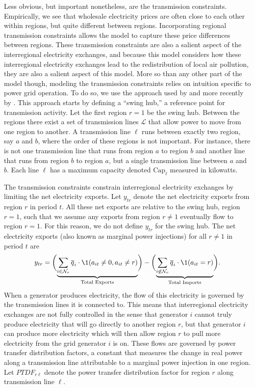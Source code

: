 Less obvious, but important nonetheless, are the transmission constraints. Empirically, we see that wholesale electricity prices are often close to each other within regions, but quite different between regions. Incorporating regional transmission constraints allows the model to capture these price differences between regions. These transmission constraints are also a salient aspect of the interregional electricity exchanges, and because this model considers how these interregional electricity exchanges lead to the redistribution of local air pollution, they are also a salient aspect of this model. More so than any other part of the model though, modeling the transmission constraints relies on intuition specific to power grid operation. To do so, we use the approach used by \cite{bushnell2017strategic} and more recently by \cite{fowlie2021border}. This approach starts by defining a ``swing hub,'' a reference point for transmission activity. Let the first region $r= 1$ be the swing hub. Between the regions there exist a set of transmission lines $\mathcal{L}$ that allow power to move from one region to another. A transmission line $\ell$ runs between exactly two region, say $a$ and $b$, where the order of these regions is not important. For instance, there is not one transmission line that runs from region $a$ to region $b$ and another line that runs from region $b$ to region $a$, but a single transmission line between $a$ and $b$. Each line $\ell$ has a maximum capacity denoted $\text{Cap}_\ell$ measured in kilowatts. 

The transmission constraints constrain interregional electricity exchanges by limiting the net electricity exports. Let $y_{tr}$ denote the net electricity exports from region $r$ in period $t$. All these net exports are relative to the swing hub, region $r =1$, such that we assume any exports from region $r \neq 1$ eventually flow to region $r = 1$. For this reason, we do not define $y_{tr}$ for the swing hub. The net electricity exports (also known as marginal power injections) for all $r \neq 1$ in period $t$ are
\begin{equation}
    y_{tr} = \biggl(\underbrace{\sum_{i \in \mathcal{N}_r} \overline{q}_i \cdot \1(a_{it} \neq 0, a_{it} \neq r)}_{\text{Total Exports}}  \biggr) - \biggl( \underbrace{\sum_{i\not\in \mathcal{N}_r} \overline{q}_i \cdot \1(a_{it} = r)}_{\text{Total Imports}} \biggr).
\end{equation}
When a generator produces electricity, the flow of this electricity is governed by the transmission lines it is connected to. This means that interregional electricity exchanges are not fully controlled in the sense that generator $i$ cannot truly produce electricity that will go directly to another region $r$, but that generator $i$ can produce more electricity which will then allow region $r$ to pull more electricity from the grid generator $i$ is on. These flows are governed by power transfer distribution factors, a constant that measures the change in real power along a transmission line attributable to a marginal power injection in one region. Let $PTDF_{r\ell}$ denote the power transfer distribution factor for region $r$ along transmission line $\ell$. 

